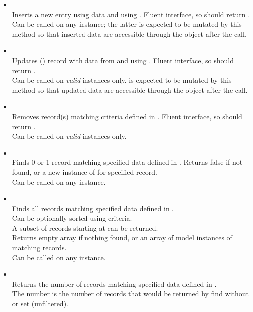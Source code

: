 \documentclass[pdftex,12pt,a4paper]{article}
\begin{document}
\begin{itemize}
	\item {} \hfill \\
	Inserts a new entry using data  and using . Fluent interface, so should return . \\
	Can be called on any  instance; the latter is expected to be mutated by this method so that inserted data are accessible through the object after the call.
	\item {} \hfill \\
	Updates () record with data from  and using . Fluent interface, so should return . \\
	Can be called on \emph{valid}  instances only.  is expected to be mutated by this method so that updated data are accessible through the object after the call.
	\item {} \hfill \\
	Removes record(s) matching criteria defined in . Fluent interface, so should return .\\
	Can be called on \emph{valid}  instances only.
	\item {} \hfill \\
	Finds 0 or 1 record matching specified data defined in . Returns false if not found, or a new instance of  for specified record. \\
	Can be called on any  instance.
	\item {} \hfill \\
	Finds all records matching specified data defined in . \\
	Can be optionally sorted using  criteria. \\
	A subset of  records starting at  can be returned.\\
	Returns empty array if nothing found, or an array of model instances of matching records. \\
	Can be called on any  instance.
	\item {} \hfill \\
	Returns the number of records matching specified data defined in . \\
	The number is the number of records that would be returned by find without  or  set (unfiltered).
\end{itemize}
\end{document}
